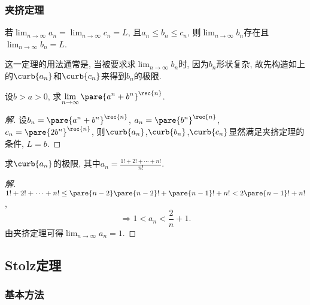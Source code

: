 \documentclass{ctexart}
\begin{document}

\subsubsection{夹挤定理} %
\label{ssub:夹挤定理}

\begin{theorem}[夹挤定理]
    \label{thm:夹挤定理}
    若$\displaystyle \lim_{n\rightarrow\infty} a_n =\lim_{n\rightarrow\infty} c_n = L$, 且$a_n \le b_n \le c_n$, 则$\displaystyle \lim_{n\rightarrow\infty} b_n$存在且$\displaystyle \lim_{n\rightarrow\infty} b_n = L$.
\end{theorem}
这一定理的用法通常是, 当被要求求$\displaystyle \lim_{n\rightarrow \infty} b_n$时, 因为$b_n$形状复杂, 故先构造如上的$\curb{a_n}$和$\curb{c_n}$来得到$b_n$的极限.
\begin{sample}
    \begin{ex}
        设$b>a>0$, 求$\displaystyle \lim_{n\rightarrow\infty} \pare{a^n+b^n}^{\rec{n}}$.
    \end{ex}
    \begin{proof}[解]
        设$\displaystyle b_n = \pare{a^n+b^n}^{\rec{n}}$, $\displaystyle a_n = \pare{b^n}^{\rec{n}}$, $\displaystyle c_n = \pare{2b^n}^{\rec{n}}$, 则$\curb{a_n}$,$\curb{b_n}$,$\curb{c_n}$显然满足夹挤定理的条件, $L = b$.
    \end{proof}
\end{sample}
\begin{sample}
    \begin{ex}
        求$\curb{a_n}$的极限, 其中$\displaystyle a_n = \frac{1! + 2! + \cdots + n!}{n!}$.
    \end{ex}
    \begin{proof}[解]
        $1!+2!+\cdots+n! \le \pare{n-2}\pare{n-2}! + \pare{n-1}! + n! < 2\pare{n-1}! + n!$,
        \[ \Rightarrow 1 < a_n < \frac{2}{n} + 1. \]
        由夹挤定理可得$\displaystyle \lim_{n\rightarrow\infty} a_n = 1$.
    \end{proof}
\end{sample}



\subsection{Stolz定理} %
\label{sub:stolz定理}

\subsubsection{基本方法} %
\label{ssub:基本方法}
\end{document}
